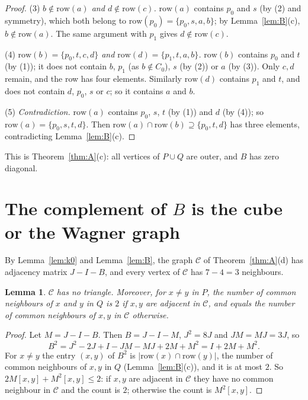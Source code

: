 \documentclass[11pt,a4paper]{article}
\newtheorem{lemma}[theorem]{Lemma}
\theoremstyle{remark}
\begin{document}
\begin{proof}
(3) \emph{$b\notin\mathrm{row}(a)$ and $d\notin\mathrm{row}(c)$.} $\mathrm{row}(a)$ contains $p_0$ and $s$ (by (2)
and symmetry), which both belong to $\mathrm{row}(p_0)=\{p_0,s,a,b\}$; by Lemma~\ref{lem:B}(c), $b\notin\mathrm{row}(a)$.
The same argument with $p_1$ gives $d\notin\mathrm{row}(c)$.

(4) \emph{$\mathrm{row}(b)=\{p_0,t,c,d\}$ and $\mathrm{row}(d)=\{p_1,t,a,b\}$.} $\mathrm{row}(b)$ contains $p_0$ and
$t$ (by (1)); it does not contain $b$, $p_1$ (as $b\notin C_0$), $s$ (by (2)) or $a$ (by (3)). Only $c,d$ remain,
and the row has four elements. Similarly $\mathrm{row}(d)$ contains $p_1$ and $t$, and does not contain $d$, $p_0$,
$s$ or $c$; so it contains $a$ and $b$.

(5) \emph{Contradiction.} $\mathrm{row}(a)$ contains $p_0$, $s$, $t$ (by (1)) and $d$ (by (4)); so
$\mathrm{row}(a)=\{p_0,s,t,d\}$. Then $\mathrm{row}(a)\cap\mathrm{row}(b)\supseteq\{p_0,t,d\}$ has three elements,
contradicting Lemma~\ref{lem:B}(c).
\end{proof}

This is Theorem~\ref{thm:A}(c): all vertices of $P\cup Q$ are outer, and $B$ has zero diagonal.

\section{The complement of $B$ is the cube or the Wagner graph}

By Lemma~\ref{lem:k0} and Lemma~\ref{lem:B}, the graph $\mathcal C$ of Theorem~\ref{thm:A}(d) has adjacency matrix
$J-I-B$, and every vertex of $\mathcal C$ has $7-4=3$ neighbours.

\begin{lemma}\label{lem:C}
$\mathcal C$ has no triangle. Moreover, for $x\ne y$ in $P$, the number of common neighbours of $x$ and $y$ in $Q$
is $2$ if $x,y$ are adjacent in $\mathcal C$, and equals the number of common neighbours of $x,y$ in $\mathcal C$
otherwise.
\end{lemma}
\begin{proof}
Let $M=J-I-B$. Then $B=J-I-M$, $J^2=8J$ and $JM=MJ=3J$, so
\[
B^2=J^2-2J+I-JM-MJ+2M+M^2=I+2M+M^2 .
\]
For $x\ne y$ the entry $(x,y)$ of $B^2$ is $|\mathrm{row}(x)\cap\mathrm{row}(y)|$, the number of common neighbours
of $x,y$ in $Q$ (Lemma~\ref{lem:B}(c)), and it is at most $2$. So $2M[x,y]+M^2[x,y]\le2$: if $x,y$ are adjacent in
$\mathcal C$ they have no common neighbour in $\mathcal C$ and the count is $2$; otherwise the count is $M^2[x,y]$.
\end{proof}
\end{document}
